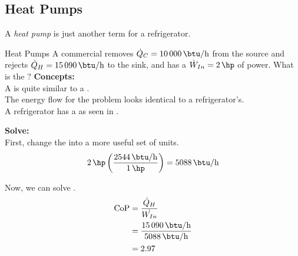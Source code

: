 \subsection{Heat Pumps}\label{subsec:Heat_Pumps}
\begin{definition}\label{def:Heat_Pump}
  A \emph{heat pump} is just another term for a refrigerator.
\end{definition}

\begin{example}{Heat Pumps}
  A commercial  removes $\FlowRate{\Heat}_{C} = \SI{10000}{\btu\per\hour}$ from the source and rejects $\FlowRate{\Heat}_{H} = \SI{15090}{\btu\per\hour}$ to the sink, and has a $\FlowRate{\Work}_{In} = \SI{2}{\hp}$ of power.
  What is the ?
  \tcblower{}
  \textbf{Concepts:} \\
  A  is quite similar to a . \\
  The energy flow for the problem looks identical to a refrigerator's. \\
  A refrigerator has a  as seen in .

  \textbf{Solve:} \\
  First, change the  into a more useful set of units.
  \begin{equation*}
    \SI{2}{\hp} \left( \frac{\SI{2544}{\btu\per\hour}}{\SI{1}{\hp}} \right) = \SI{5088}{\btu\per\hour}
  \end{equation*}

  Now, we can solve .
  \begin{align*}
    \CoP &= \frac{\FlowRate{\Heat}_{H}}{\FlowRate{\Work_{In}}} \\
         &= \frac{\SI{15090}{\btu\per\hour}}{\SI{5088}{\btu\per\hour}} \\
         &= 2.97
  \end{align*}
\end{example}


